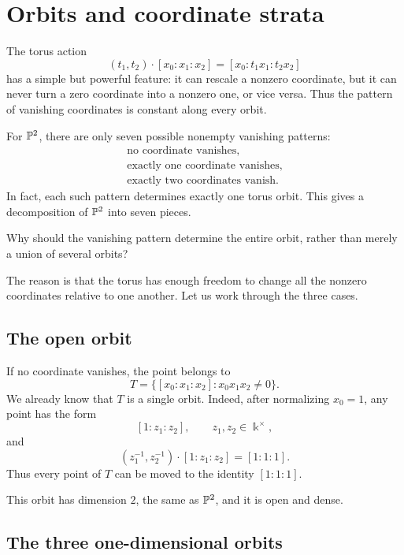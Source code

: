 \section{Orbits and coordinate strata}
\label{sec:p2-orbits}

The torus action
\[
(t_1,t_2)\cdot[x_0:x_1:x_2]
=
[x_0:t_1x_1:t_2x_2]
\]
has a simple but powerful feature: it can rescale a nonzero coordinate,
but it can never turn a zero coordinate into a nonzero one, or vice
versa. Thus the pattern of vanishing coordinates is constant along
every orbit.

For \(\mathbb{P}^2\), there are only seven possible nonempty vanishing
patterns:
\[
\begin{array}{c}
\text{no coordinate vanishes},\\
\text{exactly one coordinate vanishes},\\
\text{exactly two coordinates vanish}.
\end{array}
\]
In fact, each such pattern determines exactly one torus orbit. This
gives a decomposition of \(\mathbb{P}^2\) into seven pieces.

\begin{guidingquestion}
Why should the vanishing pattern determine the entire orbit, rather
than merely a union of several orbits?
\end{guidingquestion}

The reason is that the torus has enough freedom to change all the
nonzero coordinates relative to one another. Let us work through the
three cases.

\subsection{The open orbit}

If no coordinate vanishes, the point belongs to
\[
T
=
\{[x_0:x_1:x_2]:x_0x_1x_2\neq0\}.
\]
We already know that \(T\) is a single orbit. Indeed, after
normalizing \(x_0=1\), any point has the form
\[
[1:z_1:z_2],
\qquad
z_1,z_2\in\Bbbk^\times,
\]
and
\[
(z_1^{-1},z_2^{-1})\cdot[1:z_1:z_2]
=
[1:1:1].
\]
Thus every point of \(T\) can be moved to the identity
\([1:1:1]\).

This orbit has dimension \(2\), the same as \(\mathbb{P}^2\), and it is open
and dense.

\subsection{The three one-dimensional orbits}

